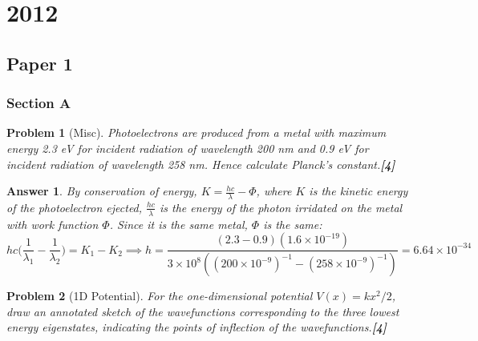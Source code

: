 \documentclass[a4paper]{article}
\newtheorem{ans}{Answer}[subsection]
\theoremstyle{new}
\newtheorem{qns}{Problem}[subsection]
\begin{document}
\section{2012}
\subsection{Paper 1}
\subsubsection{Section A}
\begin{qns}[Misc]
Photoelectrons are produced from a metal with maximum energy 2.3 eV for incident radiation of wavelength 200 nm and 0.9 eV for incident radiation of wavelength 258 nm. Hence calculate Planck’s constant.\hfill\textbf{[4]}
\end{qns}
\begin{ans}
By conservation of energy, $K=\frac{hc}{\lambda}-\Phi$, where $K$ is the kinetic energy of the photoelectron ejected, $\frac{hc}{\lambda}$ is the energy of the photon irridated on the metal with work function $\Phi$. Since it is the same metal, $\Phi$ is the same:
$$hc\bigg(\frac{1}{\lambda_1}-\frac{1}{\lambda_2}\bigg)=K_1-K_2\implies h=\frac{(2.3-0.9)(1.6\times10^{-19})}{3\times10^8((200\times10^{-9})^{-1}-(258\times10^{-9})^{-1})}=6.64\times10^{-34}$$
\end{ans}
\begin{qns}[1D Potential]
For the one-dimensional potential $V(x) = kx^2/2$, draw an annotated sketch of the wavefunctions corresponding to the three lowest energy eigenstates, indicating the points of inflection of the wavefunctions.\hfill\textbf{[4]}
\end{qns}
\end{document}
